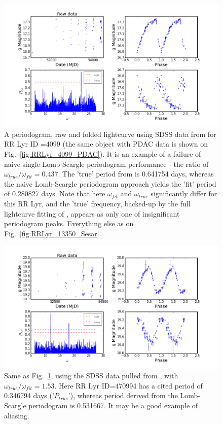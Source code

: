 \documentclass[fleqn,usenatbib]{mnras} %
\begin{document}
\begin{figure}
\includegraphics[width=\textwidth]{figs/Fig_2_RRLyr_LS_periodogram_ID_4099_g}
\caption{A periodogram, raw and folded lightcurve using SDSS data from \citep{sesar2010}  for RR Lyr ID =4099 (the same object with PDAC data is shown on Fig.~\ref{fig:RRLyr_4099_PDAC}). It is an example of a failure of naive single Lomb Scargle periodogram performance -  the ratio of $\omega_{true} / \omega_{fit} = 0.437$.  The 'true' period from \citep{sesar2010} is  0.641754 days, whereas the naive Lomb-Scargle periodogram approach yields the 'fit' period of 0.280827  days.  Note that here $\omega_{fit}$ and $\omega_{true}$ significantly differ for this RR Lyr,  and the 'true' frequency, backed-up by the full lightcurve fitting of \citep{sesar2010}, appears as only one of insignificant periodogram peaks. Everything else as on Fig.~\ref{fig:RRLyr_13350_Sesar}.}
\label{fig:RRLyr_4099_Sesar}
\end{figure}


\begin{figure}
\includegraphics[width=\textwidth]{figs/Fig_2_RRLyr_LS_periodogram_ID_470994_g}
\caption{Same as Fig.~\ref{fig:RRLyr_4099_Sesar}, using the SDSS data pulled  from \citep{sesar2010}, with $\omega_{true} / \omega_{fit} = 1.53$. Here  RR Lyr ID=470994 has a cited period of 0.346794  days ('$P_{true}$'), whereas period derived from the Lomb-Scargle periodogram is 0.531667. It may be a  good example of aliasing. }
\label{fig:RRLyr_470994_Sesar}
\end{figure}
\end{document}
